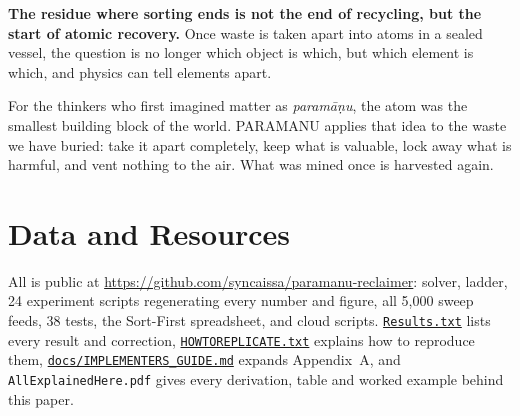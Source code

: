 \documentclass[11pt,a4paper]{article}
\newcommand{\gh}[2]{\href{https://github.com/syncaissa/paramanu-reclaimer/blob/main/#1}{\texttt{#2}}}
\theoremstyle{definition}
\theoremstyle{plain}
\theoremstyle{remark}
\begin{document}
\begin{keyinsight}
\textbf{The residue where sorting ends is not the end of recycling, but the start of atomic recovery.} Once waste is taken apart into atoms in a sealed vessel, the question is no longer which object is which, but which element is which, and physics can tell elements apart.
\end{keyinsight}

For the thinkers who first imagined matter as \emph{param\={a}\d{n}u}, the atom was the smallest building block of the world. PARAMANU applies that idea to the waste we have buried: take it apart completely, keep what is valuable, lock away what is harmful, and vent nothing to the air. What was mined once is harvested again.

\section*{Data and Resources}
All is public at \url{https://github.com/syncaissa/paramanu-reclaimer}: solver, ladder, 24 experiment scripts regenerating every number and figure, all 5,000 sweep feeds, 38 tests, the Sort-First spreadsheet, and cloud scripts. \gh{Results.txt}{Results.txt} lists every result and correction, \gh{HOWTOREPLICATE.txt}{HOWTOREPLICATE.txt} explains how to reproduce them, \gh{docs/IMPLEMENTERS_GUIDE.md}{docs/IMPLEMENTERS\_GUIDE.md} expands Appendix~A, and \texttt{AllExplainedHere.pdf} gives every derivation, table and worked example behind this paper.
\end{document}
